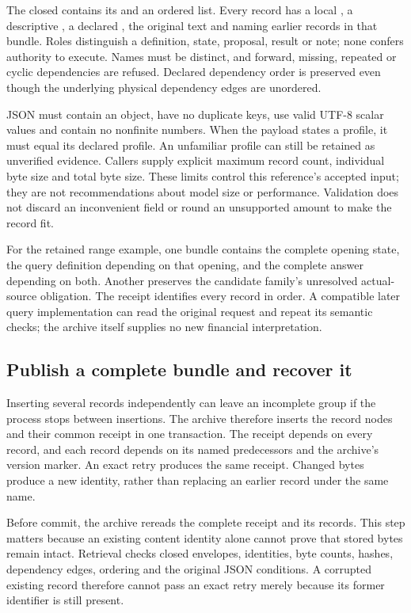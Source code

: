 The closed  contains its  and an
ordered  list. Every record has a local , a descriptive
, a declared , the original  text and
 naming earlier records in that bundle. Roles distinguish a
definition, state, proposal, result or note; none confers authority to execute.
Names must be distinct, and forward, missing, repeated or cyclic dependencies
are refused. Declared dependency order is preserved even though the underlying
physical dependency edges are unordered.

JSON must contain an object, have no duplicate keys, use valid UTF-8 scalar
values and contain no nonfinite numbers. When the payload states a profile, it
must equal its declared profile. An unfamiliar profile can still be retained
as unverified evidence. Callers supply explicit maximum record count, individual
byte size and total byte size. These limits control this reference's accepted
input; they are not recommendations about model size or performance. Validation
does not discard an inconvenient field or round an unsupported amount to make
the record fit.

For the retained range example, one bundle contains the complete opening state,
the query definition depending on that opening, and the complete answer depending
on both. Another preserves the candidate family's unresolved actual-source
obligation. The receipt identifies every record in order. A compatible later
query implementation can read the original request and repeat its semantic
checks; the archive itself supplies no new financial interpretation.

\subsection{Publish a complete bundle and recover it}

Inserting several records independently can leave an incomplete group if the
process stops between insertions. The archive therefore inserts the record
nodes and their common receipt in one transaction. The receipt depends on every
record, and each record depends on its named predecessors and the archive's
version marker. An exact retry produces the same receipt. Changed bytes produce
a new identity, rather than replacing an earlier record under the same name.

Before commit, the archive rereads the complete receipt and its records. This
step matters because an existing content identity alone cannot prove that stored
bytes remain intact. Retrieval checks closed envelopes, identities, byte counts,
hashes, dependency edges, ordering and the original JSON conditions. A corrupted
existing record therefore cannot pass an exact retry merely because its former
identifier is still present.

